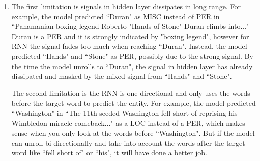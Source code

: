 \documentclass[10pt]{article}
\begin{document}
\begin{enumerate}[label=(\alph*)]
\item
The first limitation is signals in hidden layer dissipates in long range. For example, the model predicted ``Duran" as MISC instead of PER in ``Panamanian boxing legend Roberto "Hands of Stone" Duran climbs into..." Duran is a PER and it is strongly indicated by "boxing legend", however for RNN the signal fades too much when reaching ``Duran". Instead, the model predicted ``Hands" and ``Stone" as PER, possibly due to the strong signal. By the time the model unrolls to ``Duran", the signal in hidden layer has already dissipated and masked by the mixed signal from ``Hands" and ``Stone". \par
\vspace{5mm}
The second limitation is the RNN is one-directional and only uses the words before the target word to predict the entity. For example, the model predicted ``Washington" in ``The 11th-seeded Washington fell short of reprising his Wimbledon miracle comeback..." as a LOC instead of a PER, which makes sense when you only look at the words before ``Washington". But if the model can unroll bi-directionally and take into account the words after the target word like ``fell short of" or ``his", it will have done a better job.
\end{enumerate}
\clearpage
\end{document}
